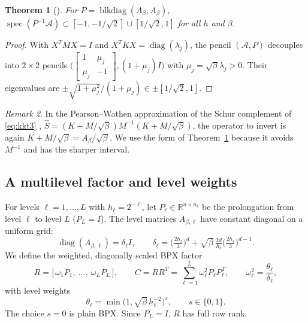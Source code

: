 \documentclass[11pt,a4paper]{article}
\newcommand{\R}{\mathbb{R}}
\newcommand{\A}{\mathcal{A}}
\newtheorem{theorem}{Theorem}[section]
\theoremstyle{remark}
\newtheorem{remark}[theorem]{Remark}
\begin{document}
\begin{theorem}[\cite{SZ07}]\label{thm:sz}
For $P=\operatorname{blkdiag}(A_\beta,A_\beta)$,
$\operatorname{spec}(P^{-1}\A)\subset[-1,-1/\sqrt2]\cup[1/\sqrt2,1]$ for all $h$ and $\beta$.
\end{theorem}
\begin{proof}
With $X^TMX=I$ and $X^TKX=\operatorname{diag}(\lambda_j)$, the pencil $(\A,P)$ decouples into
$2\times2$ pencils $\big(\begin{bmatrix}1&\mu_j\\ \mu_j&-1\end{bmatrix},(1+\mu_j)I\big)$ with
$\mu_j=\sqrt\beta\lambda_j>0$. Their eigenvalues are
$\pm\sqrt{1+\mu_j^2}/(1+\mu_j)\in\pm[1/\sqrt2,1]$.
\end{proof}

\begin{remark}
In the Pearson--Wathen approximation of the Schur complement of
\eqref{eq:kkt3} \cite{PW12}, $\widehat S=(K+M/\sqrt\beta)M^{-1}(K+M/\sqrt\beta)$,
the operator to invert is again $K+M/\sqrt\beta=A_\beta/\sqrt\beta$. We use the
form of Theorem~\ref{thm:sz} because it avoids $M^{-1}$ and has the sharper
interval.
\end{remark}

\subsection{A multilevel factor and level weights}\label{sec:weights}

For levels $\ell=1,\dots,L$ with $h_\ell=2^{-\ell}$, let $P_\ell\in\R^{n\times n_\ell}$ be the
prolongation from level $\ell$ to level $L$ ($P_L=I$). The level matrices
$A_{\beta,\ell}$ have constant diagonal on a uniform grid:
\[
\operatorname{diag}(A_{\beta,\ell})=\delta_\ell I,\qquad
\delta_\ell=\big(\tfrac{2h_\ell}{3}\big)^d+\sqrt\beta\,\tfrac{2d}{h_\ell}\big(\tfrac{2h_\ell}{3}\big)^{d-1}.
\]
We define the weighted, diagonally scaled BPX factor
\begin{equation}\label{eq:bpx}
R=\big[\,\omega_1P_1,\ \dots,\ \omega_LP_L\,\big],\qquad
C=RR^T=\sum_{\ell=1}^L\omega_\ell^2P_\ell P_\ell^T,\qquad
\omega_\ell^2=\frac{\theta_\ell}{\delta_\ell},
\end{equation}
with level weights
\begin{equation}\label{eq:theta}
\theta_\ell=\min\big(1,\sqrt\beta\,h_\ell^{-2}\big)^s,\qquad s\in\{0,1\}.
\end{equation}
The choice $s=0$ is plain BPX. Since $P_L=I$, $R$ has full row rank.
\end{document}
